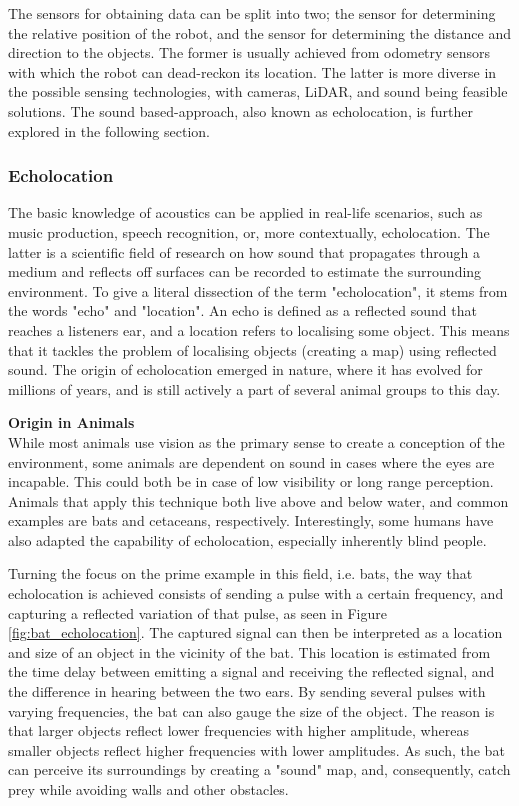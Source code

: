 The sensors for obtaining data can be split into two; the sensor for determining the relative position of the robot, and the sensor for determining the distance and direction to the objects. The former is usually achieved from odometry sensors with which the robot can dead-reckon its location. The latter is more diverse in the possible sensing technologies, with cameras, LiDAR, and sound being feasible solutions. The sound based-approach, also known as echolocation, is further explored in the following section. 


\subsubsection{Echolocation}\label{subsec:Echolocation}
The basic knowledge of acoustics can be applied in real-life scenarios, such as music production, speech recognition, or, more contextually, echolocation. The latter is a scientific field of research on how sound that propagates through a medium and reflects off surfaces can be recorded to estimate the surrounding environment. To give a literal dissection of the term "echolocation", it stems from the words "echo" and "location". An echo is defined as a reflected sound that reaches a listeners ear, and a location refers to localising some object. This means that it tackles the problem of localising objects (creating a map) using reflected sound. The origin of echolocation emerged in nature, where it has evolved for millions of years, and is still actively a part of several animal groups to this day. \cite{Echolocation:Echolocation_behaviour}

\textbf{Origin in Animals}\\
While most animals use vision as the primary sense to create a conception of the environment, some animals are dependent on sound in cases where the eyes are incapable. This could both be in case of low visibility or long range perception. Animals that apply this technique both live above and below water, and common examples are bats and cetaceans, respectively. Interestingly, some humans have also adapted the capability of echolocation, especially inherently blind people. \cite{Echolocation:Echolocation_behaviour}

Turning the focus on the prime example in this field, i.e. bats, the way that echolocation is achieved consists of sending a pulse with a certain frequency, and capturing a reflected variation of that pulse, as seen in Figure \ref{fig:bat_echolocation}. The captured signal can then be interpreted as a location and size of an object in the vicinity of the bat. This location is estimated from the time delay between emitting a signal and receiving the reflected signal, and the difference in hearing between the two ears. By sending several pulses with varying frequencies, the bat can also gauge the size of the object. The reason is that larger objects reflect lower frequencies with higher amplitude, whereas smaller objects reflect higher frequencies with lower amplitudes. As such, the bat can perceive its surroundings by creating a "sound" map, and, consequently, catch prey while avoiding walls and other obstacles. \cite{Echolocation:Echolocation_bats}

